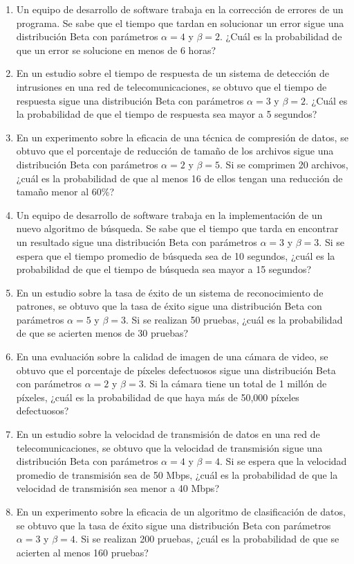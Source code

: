 \begin{Ejer}
\begin{enumerate}
\item Un equipo de desarrollo de software trabaja en la corrección de errores de un programa. Se sabe que el tiempo que tardan en solucionar un error sigue una distribución Beta con parámetros $\alpha=4$ y $\beta=2$. ¿Cuál es la probabilidad de que un error se solucione en menos de 6 horas?

\item En un estudio sobre el tiempo de respuesta de un sistema de detección de intrusiones en una red de telecomunicaciones, se obtuvo que el tiempo de respuesta sigue una distribución Beta con parámetros $\alpha=3$ y $\beta=2$. ¿Cuál es la probabilidad de que el tiempo de respuesta sea mayor a 5 segundos?

\item En un experimento sobre la eficacia de una técnica de compresión de datos, se obtuvo que el porcentaje de reducción de tamaño de los archivos sigue una distribución Beta con parámetros $\alpha=2$ y $\beta=5$. Si se comprimen 20 archivos, ¿cuál es la probabilidad de que al menos 16 de ellos tengan una reducción de tamaño menor al 60\%?

\item Un equipo de desarrollo de software trabaja en la implementación de un nuevo algoritmo de búsqueda. Se sabe que el tiempo que tarda en encontrar un resultado sigue una distribución Beta con parámetros $\alpha=3$ y $\beta=3$. Si se espera que el tiempo promedio de búsqueda sea de 10 segundos, ¿cuál es la probabilidad de que el tiempo de búsqueda sea mayor a 15 segundos?

\item En un estudio sobre la tasa de éxito de un sistema de reconocimiento de patrones, se obtuvo que la tasa de éxito sigue una distribución Beta con parámetros $\alpha=5$ y $\beta=3$. Si se realizan 50 pruebas, ¿cuál es la probabilidad de que se acierten menos de 30 pruebas?

\item En una evaluación sobre la calidad de imagen de una cámara de video, se obtuvo que el porcentaje de píxeles defectuosos sigue una distribución Beta con parámetros $\alpha=2$ y $\beta=3$. Si la cámara tiene un total de 1 millón de píxeles, ¿cuál es la probabilidad de que haya más de 50{,}000 píxeles defectuosos?

\item En un estudio sobre la velocidad de transmisión de datos en una red de telecomunicaciones, se obtuvo que la velocidad de transmisión sigue una distribución Beta con parámetros $\alpha=4$ y $\beta=4$. Si se espera que la velocidad promedio de transmisión sea de 50 Mbps, ¿cuál es la probabilidad de que la velocidad de transmisión sea menor a 40 Mbps?

\item En un experimento sobre la eficacia de un algoritmo de clasificación de datos, se obtuvo que la tasa de éxito sigue una distribución Beta con parámetros $\alpha=3$ y $\beta=4$. Si se realizan 200 pruebas, ¿cuál es la probabilidad de que se acierten al menos 160 pruebas?

\end{enumerate}
\end{Ejer} 



